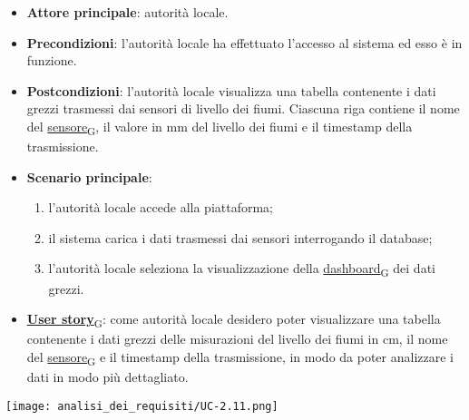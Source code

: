 \begin{itemize}
	\item \textbf{Attore principale}: autorità locale.
	\item \textbf{Precondizioni}: l'autorità locale ha effettuato l'accesso al sistema ed esso è in funzione.
	\item \textbf{Postcondizioni}: l'autorità locale visualizza una tabella contenente i dati grezzi trasmessi dai sensori di livello dei fiumi.
	      Ciascuna riga contiene il nome del \href{https://7last.github.io/docs/pb/documentazione-interna/glossario\#sensore}{sensore\textsubscript{G}}, il valore in mm del livello dei fiumi e il timestamp della trasmissione.
	\item \textbf{Scenario principale}:
	      \begin{enumerate}
		      \item l'autorità locale accede alla piattaforma;
		      \item il sistema carica i dati trasmessi dai sensori interrogando il database;
		      \item l'autorità locale seleziona la visualizzazione della \href{https://7last.github.io/docs/pb/documentazione-interna/glossario\#dashboard}{dashboard\textsubscript{G}} dei dati grezzi.
	      \end{enumerate}
	\item \href{https://7last.github.io/docs/pb/documentazione-interna/glossario\#user-story}{\textbf{User story}\textsubscript{G}}:
	      come autorità locale desidero poter visualizzare una tabella contenente i dati grezzi delle misurazioni del livello dei fiumi in cm,
	      il nome del \href{https://7last.github.io/docs/pb/documentazione-interna/glossario\#sensore}{sensore\textsubscript{G}} e il timestamp della trasmissione, in modo da poter analizzare i dati in modo più dettagliato.
\end{itemize}
\begin{center}
	\texttt{[image: analisi\_dei\_requisiti/UC-2.11.png]}
\end{center}


